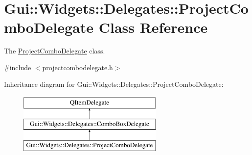 \hypertarget{classGui_1_1Widgets_1_1Delegates_1_1ProjectComboDelegate}{\section{Gui\-:\-:Widgets\-:\-:Delegates\-:\-:Project\-Combo\-Delegate Class Reference}
\label{classGui_1_1Widgets_1_1Delegates_1_1ProjectComboDelegate}
}


The \hyperlink{classGui_1_1Widgets_1_1Delegates_1_1ProjectComboDelegate}{Project\-Combo\-Delegate} class.  




{\ttfamily \#include $<$projectcombodelegate.\-h$>$}

Inheritance diagram for Gui\-:\-:Widgets\-:\-:Delegates\-:\-:Project\-Combo\-Delegate\-:\begin{figure}[H]
\begin{center}
\leavevmode
\includegraphics[height=3.000000cm]{d6/d93/classGui_1_1Widgets_1_1Delegates_1_1ProjectComboDelegate}
\end{center}
\end{figure}

